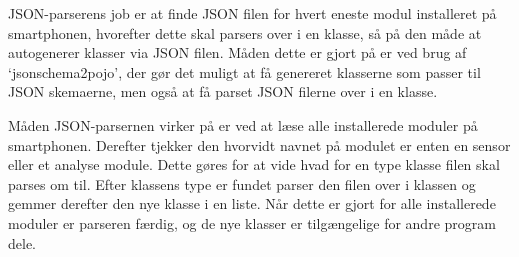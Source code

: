 JSON-parserens job er at finde JSON filen for hvert eneste modul installeret på smartphonen, hvorefter dette skal parsers over i en klasse, så på den måde at autogenerer klasser via JSON filen.
Måden dette er gjort på er ved brug af `jsonschema2pojo', der gør det muligt at få genereret klasserne som passer til JSON skemaerne, men også at få parset JSON filerne over i en klasse.

Måden JSON-parsernen virker på er ved at læse alle installerede moduler på smartphonen.
Derefter tjekker den hvorvidt navnet på modulet er enten en sensor eller et analyse module.
Dette gøres for at vide hvad for en type klasse filen skal parses om til.
Efter klassens type er fundet parser den filen over i klassen og gemmer derefter den nye klasse i en liste.
Når dette er gjort for alle installerede moduler er parseren færdig, og de nye klasser er tilgængelige for andre program dele.